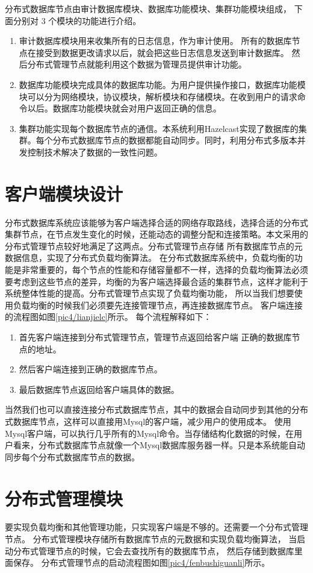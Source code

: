 分布式数据库节点由审计数据库模块、数据库功能模块、集群功能模块组成，
 下面分别对 3 个模块的功能进行介绍。
 \begin{enumerate}[fullwidth,itemindent=2em,listparindent=2em]
 	\item 审计数据库模块用来收集所有的日志信息，作为审计使用。
 	所有的数据库节点在接受到数据更改请求以后，就会把这些日志信息发送到审计数据库。
 	然后分布式管理节点就能利用这个数据为管理员提供审计功能。
 	\item 数据库功能模块完成具体的数据库功能。为用户提供操作接口，数据库功能模块可以分为网络模块，协议模块，解析模块和存储模块。在收到用户的请求命令以后。数据库功能模块就会对用户返回正确的信息。
 	\item 集群功能实现每个数据库节点的通信。本系统利用Hazelcast实现了数据库的集群。每个分布式数据库节点的数据都能自动同步。同时，利用分布式多版本并发控制技术解决了数据的一致性问题。
 \end{enumerate}
\section{客户端模块设计}
分布式数据库系统应该能够为客户端选择合适的网络存取路线，选择合适的分布式集群节点，在节点发生变化的时候，还能动态的调整分配和连接策略。本文采用的分布式管理节点较好地满足了这两点。分布式管理节点存储
所有数据库节点的元数据信息，实现了分布式负载均衡算法。
在分布式数据库系统中，负载均衡的功能是非常重要的，每个节点的性能和存储容量都不一样，选择的负载均衡算法必须要考虑到这些节点的差异，均衡的为客户端选择最合适的集群节点，这样才能利于系统整体性能的提高。分布式管理节点实现了负载均衡功能，
所以当我们想要使用负载均衡的时候我们必须要先连接管理节点，再连接数据库节点。
客户端连接的流程图如图\ref{pic4/lianjielc}所示。
每个流程解释如下：
\begin{enumerate}[fullwidth,itemindent=2em,listparindent=2em]
	\item 首先客户端连接到分布式管理节点，管理节点返回给客户端
	正确的数据库节点的地址。
	\item 然后客户端连接到正确的数据库节点。
	\item 最后数据库节点返回给客户端具体的数据。
\end{enumerate}
当然我们也可以直接连接分布式数据库节点，其中的数据会自动同步到其他的分布式数据库节点，这样可以直接用Mysql的客户端，减少用户的使用成本。
使用Mysql客户端，可以执行几乎所有的Mysql命令。当存储结构化数据的时候，在用户看来，分布式数据库节点就像一个Mysql数据库服务器一样。只是本系统能自动同步每个分布式数据库节点的数据。
\section{分布式管理模块}
要实现负载均衡和其他管理功能，只实现客户端是不够的。还需要一个分布式管理节点。
分布式管理模块存储所有数据库节点的元数据和实现负载均衡算法，
当启动分布式管理节点的时候，它会去查找所有的数据库节点，
然后存储到数据库里面保存。
分布式管理节点的启动流程图如图\ref{pic4/fenbushiguanli}所示。

